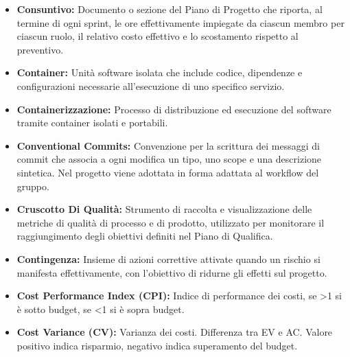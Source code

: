 \begin{itemize}[leftmargin=*]
      \item \textbf{Consuntivo:} Documento o sezione del Piano di Progetto che riporta, al termine di ogni sprint, le ore effettivamente
      impiegate da ciascun membro per ciascun ruolo, il relativo costo
      effettivo e lo scostamento rispetto al preventivo.
      \item \textbf{Container:} Unità software isolata che include codice, dipendenze e configurazioni necessarie all’esecuzione di uno specifico servizio.
      \item \textbf{Containerizzazione:} Processo di distribuzione ed esecuzione del software tramite container isolati e portabili.
      \item \textbf{Conventional Commits:} Convenzione per la scrittura dei messaggi di
      commit che associa a ogni modifica un tipo, uno scope e una descrizione
      sintetica. Nel progetto viene adottata in forma adattata al workflow del gruppo.
      \item \textbf{Cruscotto Di Qualità:} Strumento di raccolta e visualizzazione delle metriche di qualità di processo e di prodotto, utilizzato per monitorare il raggiungimento degli obiettivi definiti nel Piano di Qualifica.
      \item \textbf{Contingenza:} Insieme di azioni correttive attivate quando un rischio si manifesta effettivamente, con l'obiettivo di ridurne gli effetti sul progetto.
      \item \textbf{Cost Performance Index (CPI):} Indice di performance dei costi, se >1 
      si è sotto budget, se <1 si è sopra budget.
      \item \textbf{Cost Variance (CV):} Varianza dei costi. 
      Differenza tra EV e AC. Valore positivo indica risparmio, 
      negativo indica superamento del budget.
\end{itemize}
 
{}
